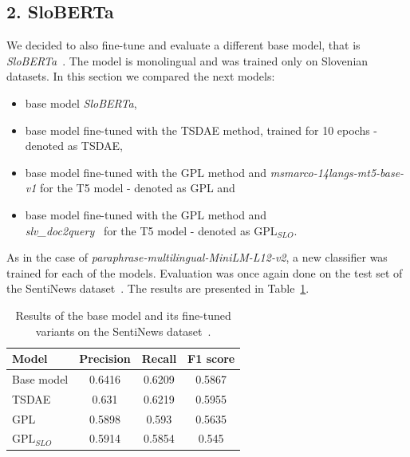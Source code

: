 \documentclass[fleqn,moreauthors,10pt]{ds_report}
\begin{document}

\subsection*{\large{2. SloBERTa}}
We decided to also fine-tune and evaluate a different base model, that is {\it SloBERTa}~\cite{sloberta}. The model is monolingual and was trained only on Slovenian datasets. In this section we compared the next models:
\begin{itemize}
	\item base model {\it SloBERTa},
	\item base model fine-tuned with the TSDAE method, trained for 10 epochs - denoted as TSDAE,
	\item base model fine-tuned with the GPL method and {\it msmarco-14langs-mt5-base-v1} \cite{msmarco14langs} for the T5 model - denoted as GPL and
	\item base model fine-tuned with the GPL method and \\{\it slv\_doc2query}~\cite{boshko} for the T5 model - denoted as $\text{GPL}_{SLO}$.
\end{itemize}

As in the case of {\it paraphrase-multilingual-MiniLM-L12-v2}, a new classifier was trained for each of the models. Evaluation was once again done on the test set of the SentiNews dataset~\cite{sentiNews}. The results are presented in Table~\ref{tab4}.

\begin{table}[!h]
	\footnotesize
	\begin{center}
		\begin{tabular}{ |l|c|c|c| }
		\hline
		\rowcolor{Blue}Model & Precision & Recall & F1 score\\
		\hline

		Base model & 0.6416 & 0.6209 & 0.5867\\
		\hline
		TSDAE & 0.631 & 0.6219 & 0.5955\\
		\hline
		GPL & 0.5898 & 0.593 & 0.5635\\
		$\text{GPL}_{SLO}$ & 0.5914 & 0.5854 & 0.545\\

		\hline
		\end{tabular}
	\end{center}
\caption{Results of the base model and its fine-tuned variants on the SentiNews dataset~\cite{sentiNews}.}
\label{tab4}
\end{table}
\end{document}
